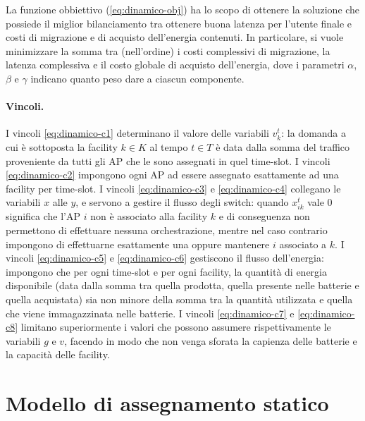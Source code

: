 La funzione obbiettivo (\ref{eq:dinamico-obj}) ha lo scopo di ottenere la soluzione che possiede il miglior bilanciamento tra ottenere buona latenza per l'utente finale e costi di migrazione e di acquisto dell'energia contenuti. In particolare, si vuole minimizzare la somma tra (nell'ordine) i costi complessivi di migrazione, la latenza complessiva e il costo globale di acquisto dell'energia, dove i parametri $\alpha$, $\beta$ e $\gamma$ indicano quanto peso dare a ciascun componente.

\paragraph*{Vincoli.}

I vincoli \ref{eq:dinamico-c1} determinano il valore delle variabili $v^t_k$: la domanda a cui è sottoposta la facility $k \in K$ al tempo $t \in T$ è data dalla somma del traffico proveniente da tutti gli AP che le sono assegnati in quel time-slot. I vincoli \ref{eq:dinamico-c2} impongono ogni AP ad essere assegnato esattamente ad una facility per time-slot. I vincoli \ref{eq:dinamico-c3} e \ref{eq:dinamico-c4} collegano le variabili $x$ alle $y$, e servono a gestire il flusso degli switch: quando $x^t_{ik}$ vale 0 significa che l'AP $i$ non è associato alla facility $k$ e di conseguenza non permettono di effettuare nessuna orchestrazione, mentre nel caso contrario impongono di effettuarne esattamente una oppure mantenere $i$ associato a $k$. I vincoli \ref{eq:dinamico-c5} e \ref{eq:dinamico-c6} gestiscono il flusso dell'energia: impongono che per ogni time-slot e per ogni facility, la quantità di energia disponibile (data dalla somma tra quella prodotta, quella presente nelle batterie e quella acquistata) sia non minore della somma tra la quantità utilizzata e quella che viene immagazzinata nelle batterie. I vincoli \ref{eq:dinamico-c7} e \ref{eq:dinamico-c8} limitano superiormente i valori che possono assumere rispettivamente le variabili $g$ e $v$, facendo in modo che non venga sforata la capienza delle batterie e la capacità delle facility.


%
%
\section{Modello di assegnamento statico}
\label{sec:modello-statico}

